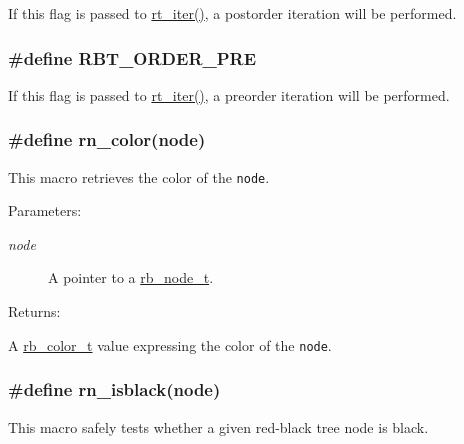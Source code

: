 If this flag is passed to \hyperlink{group__dbprim__rbtree_a11}{rt\_\-iter()}, a postorder iteration will be performed. \hypertarget{group__dbprim__rbtree_a21}{
\subsubsection[RBT\_\-ORDER\_\-PRE]{\setlength{\rightskip}{0pt plus 5cm}\#define RBT\_\-ORDER\_\-PRE}}
\label{group__dbprim__rbtree_a21}


If this flag is passed to \hyperlink{group__dbprim__rbtree_a11}{rt\_\-iter()}, a preorder iteration will be performed. \hypertarget{group__dbprim__rbtree_a27}{
\subsubsection[rn\_\-color]{\setlength{\rightskip}{0pt plus 5cm}\#define rn\_\-color(node)}}
\label{group__dbprim__rbtree_a27}


This macro retrieves the color of the {\tt node}.\begin{Desc}
\item[Parameters: ]\par
\begin{description}
\item[{\em 
node}]A pointer to a \hyperlink{group__dbprim__rbtree_a1}{rb\_\-node\_\-t}.\end{description}
\end{Desc}
\begin{Desc}
\item[Returns: ]\par
A \hyperlink{group__dbprim__rbtree_a4}{rb\_\-color\_\-t} value expressing the color of the {\tt node}. \end{Desc}
\hypertarget{group__dbprim__rbtree_a34}{
\subsubsection[rn\_\-isblack]{\setlength{\rightskip}{0pt plus 5cm}\#define rn\_\-isblack(node)}}
\label{group__dbprim__rbtree_a34}


This macro safely tests whether a given red-black tree node is black.

